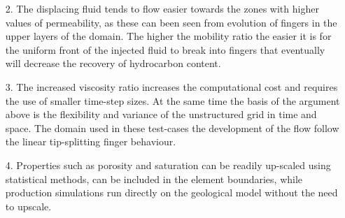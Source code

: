 \documentclass[preprint,authoryear,12pt]{elsarticle}
\begin{document}
{\begin{enumerate}
\item[2.] The displacing fluid tends to flow easier towards the zones with higher values of permeability, as these can been seen from evolution of fingers in the upper layers of the domain. The higher the mobility ratio the easier it is for the uniform front of the injected fluid to break into fingers that eventually will decrease the recovery of hydrocarbon content.
\item[3.] The increased viscosity ratio increases the computational cost and requires the use of smaller time-step sizes. At the same time the basis of the argument above is the flexibility and variance of the unstructured grid in time and space. The domain used in these test-cases the development of the flow follow the linear tip-splitting finger behaviour.
\item[4.] Properties such as porosity and saturation can be readily up-scaled using statistical methods, can be included in the element boundaries,  while production simulations run directly on the geological model without the need to upscale.
\end{enumerate}



}
\end{document}
